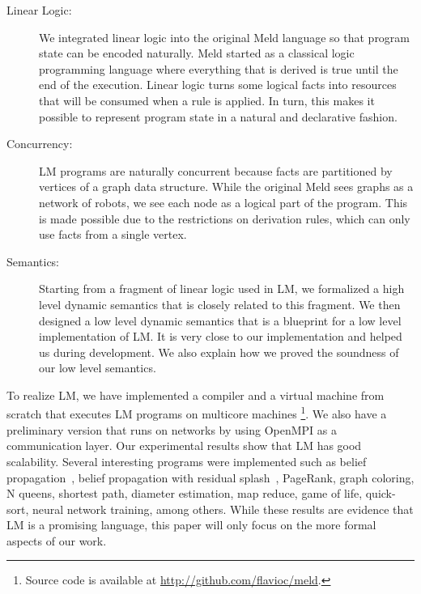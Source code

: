 \begin{description}
   \item[Linear Logic:] We integrated linear logic into the original Meld language so that program state can be encoded naturally.
   Meld started as a classical logic programming language where everything that is derived is true until the end
   of the execution. Linear logic turns some logical facts into resources that will be consumed when a rule is applied. In turn, this makes it possible to represent program state in a natural and declarative fashion.
   \item[Concurrency:] LM programs are naturally concurrent because facts are partitioned by vertices of a graph data structure. While the original Meld sees graphs as a network of robots, we see each node as a logical part of the program. This is made possible due to the restrictions on derivation rules, which can only use facts from a single vertex.
   \item[Semantics:] Starting from a fragment of linear logic used in LM, we formalized a high level dynamic semantics that is closely related to this fragment.
   We then designed a low level dynamic semantics that is a blueprint for a low level implementation of LM. It is very
   close to our implementation and helped us during development. We also explain how we proved the soundness of our low level semantics.
\end{description}

To realize LM, we have implemented a compiler and a virtual machine from scratch that executes LM programs on multicore machines
\footnote{Source code is available at \url{http://github.com/flavioc/meld}.}. We also have a preliminary version that runs on networks by
using OpenMPI as a communication layer. Our experimental results show that LM has good scalability.
Several interesting programs were implemented such as belief propagation~\cite{Gonzalez+al:aistats09paraml},
belief propagation with residual splash~\cite{Gonzalez+al:aistats09paraml}, PageRank, graph coloring,
N queens, shortest path, diameter estimation, map reduce, game of life, quick-sort, neural network training, among others.
While these results are evidence that LM is a promising language, this paper will only focus on the more formal aspects of our work.
